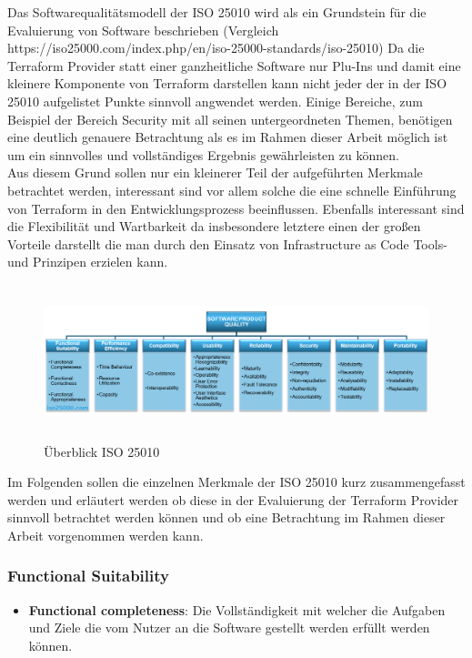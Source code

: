 \begin{spacing}{1.2}
Das Softwarequalitätsmodell der ISO 25010 wird als ein Grundstein für die
Evaluierung von Software beschrieben (Vergleich https://iso25000.com/index.php/en/iso-25000-standards/iso-25010)
Da die Terraform Provider statt einer ganzheitliche Software nur Plu-Ins
und damit eine kleinere Komponente von Terraform darstellen kann nicht
jeder der in der ISO 25010 aufgelistet Punkte sinnvoll angwendet werden.
Einige Bereiche, zum Beispiel der Bereich Security mit all seinen
untergeordneten Themen, benötigen eine deutlich genauere Betrachtung als
es im Rahmen dieser Arbeit möglich ist um ein sinnvolles und vollständiges
Ergebnis gewährleisten zu können.\\
Aus diesem Grund sollen nur ein kleinerer Teil der aufgeführten Merkmale
betrachtet werden, interessant sind vor allem solche die eine schnelle
Einführung von Terraform in den Entwicklungsprozess beeinflussen.
Ebenfalls interessant sind die Flexibilität und Wartbarkeit da
insbesondere letztere einen der großen Vorteile darstellt die man durch
den Einsatz von Infrastructure as Code Tools- und Prinzipen erzielen kann.

\begin{figure}[H]
  \includegraphics[keepaspectratio, height=4.5cm]{fig/hauptteil/ISO25010.png}
  \caption{Überblick ISO 25010}
  \centering
\end{figure}

Im Folgenden sollen die einzelnen Merkmale der ISO 25010 kurz
zusammengefasst werden und erläutert werden ob diese in der Evaluierung
der Terraform Provider sinnvoll betrachtet werden können und ob eine
Betrachtung im Rahmen dieser Arbeit vorgenommen werden kann.

\subsubsection{Functional Suitability}

\begin{itemize}
  \item \textbf{Functional completeness}: Die Vollständigkeit mit welcher
  die Aufgaben und Ziele die vom Nutzer an die Software gestellt werden
  erfüllt werden können.


\end{itemize}
\end{spacing}

